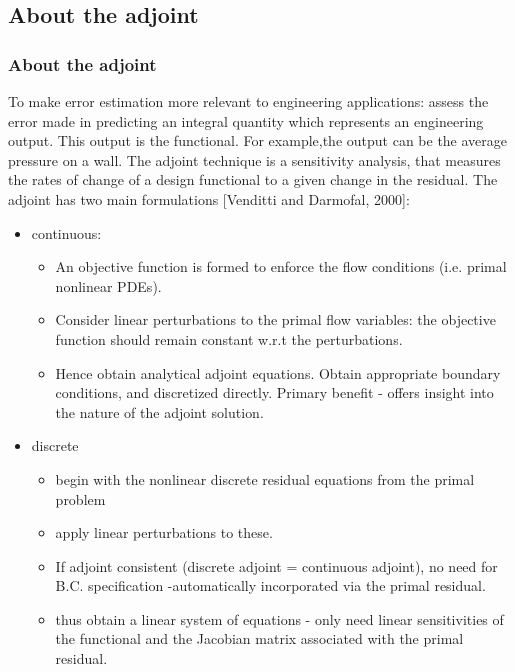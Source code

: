 \documentclass{beamer}
\begin{document}
\subsection[Adjoint]{About the adjoint}
\begin{frame}%
\scriptsize
\frametitle{About the adjoint}
To make error estimation more relevant to engineering applications: assess the error made in predicting an integral quantity which represents an engineering output. This output is the functional. For example,the output can be the average pressure on a wall. The adjoint technique is a sensitivity analysis, that measures the rates of change of a design functional to a given change in the residual.\newline
The adjoint has two main formulations [Venditti and Darmofal, 2000]:
\begin{itemize}
\item continuous:
\begin{itemize} 
\tiny
\item An objective function is formed to enforce the flow conditions (i.e. primal nonlinear PDEs). 
\item Consider linear perturbations to the primal flow variables: the objective function should remain constant w.r.t the perturbations.
\item Hence obtain analytical adjoint equations. Obtain appropriate boundary conditions, and discretized directly. Primary benefit - offers insight into the nature of the adjoint solution.
\end{itemize}
\item discrete 
\begin{itemize}
\tiny
\item begin with the nonlinear discrete residual equations from the primal problem
\item apply linear perturbations to these. 
\item If adjoint consistent (discrete adjoint = continuous adjoint), no need for B.C. specification -automatically incorporated via the primal residual.   
\item thus obtain a linear system of equations - only need linear sensitivities of the functional and the Jacobian matrix associated with the primal residual.
\end{itemize}
\end{itemize}
\end{frame}
\end{document}
